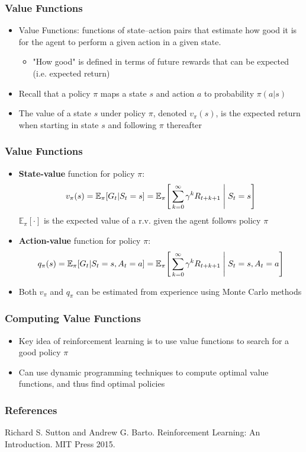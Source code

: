 \documentclass{beamer}
\begin{document}
\begin{frame}
\frametitle{Value Functions}
\begin{itemize}
\item Value Functions: functions of state--action pairs that estimate how good it is for the agent to perform a given action in a given state. 
   \begin{itemize}
   	\item "How good" is defined in terms of future rewards that can be expected (i.e. expected return)
      \end{itemize}
\item Recall that a policy $\pi$ maps a state $s$ and action $a$ to probability $\pi(a|s)$
\item The value of a state $s$ under policy $\pi$, denoted $v_\pi(s)$, is the expected return when starting in state $s$ and following $\pi$ thereafter

\end{itemize}
\end{frame}


\begin{frame}
\frametitle{Value Functions}
\begin{itemize}
\item \textbf{State-value} function for policy $\pi$:
\begin{equation}
v_\pi(s) = \mathbb{E}_\pi[G_t | S_t = s] = \mathbb{E}_\pi\Bigg[\sum_{k=0}^{\infty} \gamma^k R_{t+k+1} \Biggm\lvert S_t = s \Bigg]
\nonumber
\end{equation}
$\mathbb{E}_\pi[\cdot]$ is the expected value of a r.v. given the agent follows policy $\pi$
\item \textbf{Action-value} function for policy $\pi$:
\begin{equation}
q_\pi(s) = \mathbb{E}_\pi[G_t | S_t = s, A_t = a] = \mathbb{E}_\pi\Bigg[\sum_{k=0}^{\infty} \gamma^k R_{t+k+1} \Biggm\lvert S_t = s, A_t = a \Bigg]
\nonumber
\end{equation}
\item Both $v_\pi$ and $q_\pi$ can be estimated from experience using Monte Carlo methods
\end{itemize}
\end{frame}



\begin{frame}
\frametitle{Computing Value Functions}
\begin{itemize}
\item Key idea of reinforcement learning is to use value functions to search for a good policy $\pi$
\item Can use dynamic programming techniques to compute optimal value functions, and thus find optimal policies
\end{itemize}
\end{frame}



\begin{frame}
\frametitle{References}

Richard S. Sutton and Andrew G. Barto. Reinforcement Learning: An Introduction. MIT Press 2015.

\end{frame}

\end{document}
